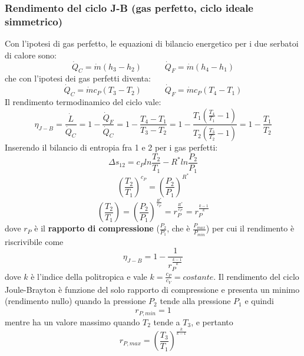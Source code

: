 \subsubsection{Rendimento del ciclo J-B (gas perfetto, ciclo ideale simmetrico)}
Con l’ipotesi di gas perfetto, le equazioni di bilancio energetico per i due serbatoi
di calore sono:
\[
        \dot{Q}_C = \dot{m} (h_3-h_2) \;\;\;\;\;\;\;\;\;\; \dot{Q}_F = \dot{m}(h_4 -h_1)
\]
che con l'ipotesi dei gas perfetti diventa:
\[
    \dot{Q}_C = \dot{m} c_P(T_3-T_2) \;\;\;\;\;\;\;\;\;\; \dot{Q}_F = \dot{m}c_P (T_4-T_1)
\]
Il rendimento termodinamico del ciclo vale:
\[
    \eta_{J-B} = \frac{\dot{L}}{\dot{Q}_C} = 1 - \frac{\dot{Q}_F}{\dot{Q}_C} = 1- \frac{T_4-T_1}{T_3-T_2} = 1- \frac{T_1 \left(\frac{T_4}{T_1} - 1\right)}{T_2 \left(\frac{T_3}{T_2}-1\right)} = 1- \frac{T_1}{T_2}
\]
Inserendo il bilancio di entropia fra 1 e 2 per i gas perfetti:
\[
    \Delta s_{12} = c_P ln \frac{T_2}{T_1}- R^* ln \frac{P_2}{P_1}
\]
\[
    \left(\frac{T_2}{T_1}\right)^{c_P} = \left(\frac{P_2}{P_1}\right)^{R^*}
\]
\[
    \left(\frac{T_2}{T_1}\right) = \left(\frac{P_2}{P_1}\right)^{\frac{R^*}{c_P}} = r_P^{\frac{R^*}{c_P}} = r_P^{\frac{k-1}{k}}
\]
dove $r_P$ è il \textbf{rapporto di compressione} ($\frac{P_2}{P_1}$, che è $\frac{P_{max}}{P_{min}}$) per cui il rendimento è riscrivibile come
\[
    \eta_{J-B} = 1- \frac{1}{r_P^{\frac{k-1}{k}}}
\]
dove $k$ è l'indice della politropica e vale $k = \frac{c_P}{c_V} = costante$.\newline
\newline
Il rendimento del ciclo Joule-Brayton è funzione del solo rapporto di compressione e presenta un minimo (rendimento nullo) quando la pressione $P_2$ tende alla pressione $P_1$ e quindi
\[
    r_{P,min} = 1
\]
mentre ha un valore massimo quando $T_2$ tende a $T_3$, e pertanto
\[
    r_{P,max} = \left(\frac{T_3}{T_1}\right)^{\frac{k}{k-1}}
\]
